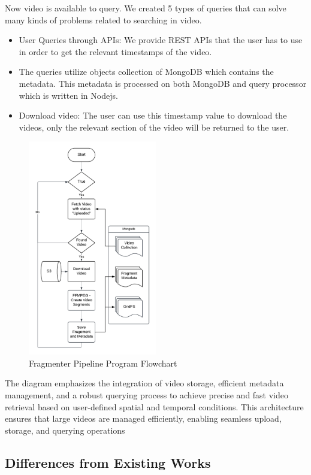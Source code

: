 \documentclass[conference]{IEEEtran}
\begin{document}
Now video is available to query. We created 5 types of queries that can solve many kinds of problems related to searching in video.
\begin{itemize}[itemsep=5pt]
    \item User Queries through APIs: We provide REST APIs that the user has to use in order to get the relevant timestamps of the video.
    \item The queries utilize objects collection of MongoDB which contains the metadata. This metadata is processed on both MongoDB and query processor which is written in Nodejs.
    \item Download video: The user can use this timestamp value to download the videos, only the relevant section of the video will be returned to the user.
\end{itemize}
\begin{figure}[h!]
\centering
\includegraphics[width=0.5\textwidth]{Fragmenter.png}
\caption{Fragmenter Pipeline Program Flowchart}
\label{fig:upload_flow}
\end{figure}
The diagram emphasizes the integration of video storage, efficient metadata management, and a robust querying process to achieve precise and fast video retrieval based on user-defined spatial and temporal conditions. This architecture ensures that large videos are managed efficiently, enabling seamless upload, storage, and querying operations

\subsection{Differences from Existing Works}
\end{document}
